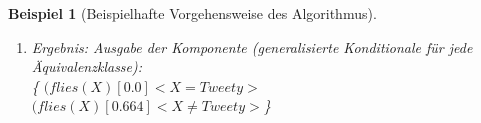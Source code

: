\documentclass[draft]{scrreprt}
\newtheorem{Bsp}{Beispiel}[section]
\begin{document}
{\begin{Bsp}[Beispielhafte Vorgehensweise des Algorithmus]
\begin{enumerate}
\begin{quote}
			
			Positive Generalisierung:\\  
			$ (flies(X))[0.0]<X=Tweety> $\\
			$ flies(X)[0.664] <X=Bully \lor  X=Sylvester \lor X=Kirby> $\\
			Negative Generalisierung:\\  
			$ flies(X)[0.0] <X=Tweety> $\\
			$ flies(X)[0.664] <X \neq Tweety> $\\
			Logische Minimierung des Constraints\\
			Vergleich der Generalisierungen und Wahl derjenigen mit dem kürzeren Constraint\\
		\end{quote}
	\item Ergebnis: Ausgabe der Komponente (generalisierte Konditionale für jede Äquivalenzklasse):\\
	\{ $ (flies(X)[0.0] <X=Tweety> $\\
	$ (flies(X)[0.664] <X \neq Tweety> $\}
	
	\end{enumerate}
	
\end{Bsp}

}
\end{document}
